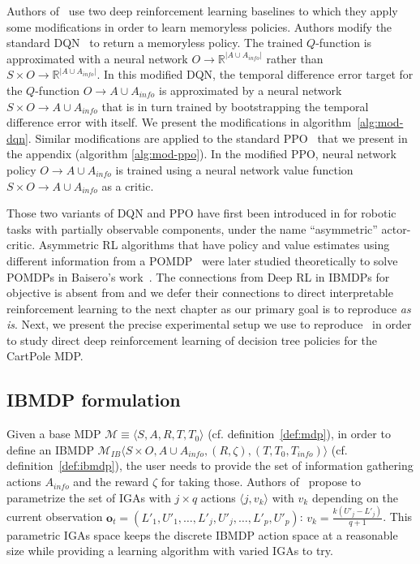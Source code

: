 Authors of~\cite{topin2021iterative} use two deep reinforcement learning baselines to which they apply some modifications in order to learn memoryless policies.
Authors modify the standard DQN~\citep{dqn} to return a memoryless policy. The trained $Q$-function is approximated with a neural network $O\rightarrow \mathbb{R}^{|A\cup A_{info}|}$ rather than $S\times O\rightarrow \mathbb{R}^{|A\cup A_{info}|}$.
In this modified DQN, the temporal difference error target for the $Q$-function $O\rightarrow A\cup A_{info}$ is approximated by a neural network $S\times O\rightarrow A\cup A_{info}$ that is in turn trained by bootstrapping the temporal difference error with itself.
We present the modifications in algorithm~\ref{alg:mod-dqn}.
Similar modifications are applied to the standard PPO~\citep{ppo} that we present in the appendix (algorithm \ref{alg:mod-ppo}). In the modified PPO, neural network policy $O\rightarrow A\cup A_{info}$ is trained using a neural network value function $S\times O\rightarrow A\cup A_{info}$ as a critic.

Those two variants of DQN and PPO have first been introduced in \citep{pinto} for robotic tasks with partially observable components, under the name ``asymmetric'' actor-critic. 
Asymmetric RL algorithms that have policy and value estimates using different information from a POMDP~\citep{POMDP,chap2} were later studied theoretically to solve POMDPs in Baisero's work~\citep{baisero-dqn,baisero-ppo}.
The connections from Deep RL in IBMDPs for objective is absent from \citep{topin2021iterative} and we defer their connections to direct interpretable reinforcement learning to the next chapter as our primary goal is to reproduce \citep{topin2021iterative} \textit{as is}.
Next, we present the precise experimental setup we use to reproduce~\citep{topin2021iterative} in order to study direct deep reinforcement learning of decision tree policies for the CartPole MDP.

\subsection{IBMDP formulation}\label{sec:ibmdp-paper}
Given a base MDP $\mathcal{M}\equiv\langle S, A, R, T, T_0\rangle$ (cf. definition~\ref{def:mdp}), in order to define an IBMDP $\mathcal{M}_{IB}\langle S\times O, A\cup A_{info}, (R, \zeta),( T, T_0, T_{info})\rangle$ (cf. definition~\ref{def:ibmdp}), the user needs to provide the set of information gathering actions $A_{info}$ and the reward $\zeta$ for taking those.
Authors of~\citep{topin2021iterative} propose to parametrize the set of IGAs with $j \times q$ actions $\langle j, v_k \rangle$ with $v_k$ depending on the current observation $\boldsymbol{o}_t=(L'_1, U'_1, \dots, L'_j, U'_j, \dots, L'_p, U'_p)$: $v_k = \frac{k(U'_j - L'_j)}{q+1}$.
This parametric IGAs space keeps the discrete IBMDP action space at a reasonable size while providing a learning algorithm with varied IGAs to try.

